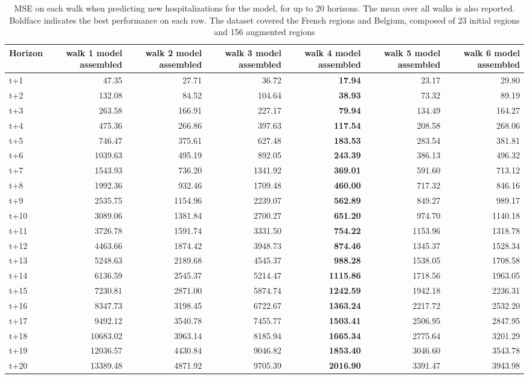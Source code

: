 \begin{table}[H]
\centering
\caption{MSE on each walk when predicting new hospitalizations for the model, for up to 20 horizons. The mean over all walks is also reported. Boldface indicates the best performance on each row. The dataset covered the French regions and Belgium, composed of 23 initial regions and 156 augmented regions }
\label{tab:MSE_walk_assembly}
\begin{tabular}{lrrrrrr}
\toprule
Horizon &  walk 1 model assembled &  walk 2 model assembled &  walk 3 model assembled &  walk 4 model assembled &  walk 5 model assembled &  walk 6 model assembled \\
\midrule
t+1  & 47.35  & 27.71  & 36.72  & \textbf{17.94}  & 23.17  & 29.80  \\
t+2  & 132.08  & 84.52  & 104.64  & \textbf{38.93}  & 73.32  & 89.19  \\
t+3  & 263.58  & 166.91  & 227.17  & \textbf{79.94}  & 134.49  & 164.27  \\
t+4  & 475.36  & 266.86  & 397.63  & \textbf{117.54}  & 208.58  & 268.06  \\
t+5  & 746.47  & 375.61  & 627.48  & \textbf{183.53}  & 283.54  & 381.81  \\
t+6  & 1039.63  & 495.19  & 892.05  & \textbf{243.39}  & 386.13  & 496.32  \\
t+7  & 1543.93  & 736.20  & 1341.92  & \textbf{369.01}  & 591.60  & 713.12  \\
t+8  & 1992.36  & 932.46  & 1709.48  & \textbf{460.00}  & 717.32  & 846.16  \\
t+9  & 2535.75  & 1154.96  & 2239.07  & \textbf{562.89}  & 849.27  & 989.17  \\
t+10  & 3089.06  & 1381.84  & 2700.27  & \textbf{651.20}  & 974.70  & 1140.18  \\
t+11  & 3726.78  & 1591.74  & 3331.50  & \textbf{754.22}  & 1153.96  & 1318.78  \\
t+12  & 4463.66  & 1874.42  & 3948.73  & \textbf{874.46}  & 1345.37  & 1528.34  \\
t+13  & 5248.63  & 2189.68  & 4545.37  & \textbf{988.28}  & 1538.05  & 1708.58  \\
t+14  & 6136.59  & 2545.37  & 5214.47  & \textbf{1115.86}  & 1718.56  & 1963.05  \\
t+15  & 7230.81  & 2871.00  & 5874.74  & \textbf{1242.59}  & 1942.18  & 2236.31  \\
t+16  & 8347.73  & 3198.45  & 6722.67  & \textbf{1363.24}  & 2217.72  & 2532.20  \\
t+17  & 9492.12  & 3540.78  & 7455.77  & \textbf{1503.41}  & 2506.95  & 2847.95  \\
t+18  & 10683.02  & 3963.14  & 8185.94  & \textbf{1665.34}  & 2775.64  & 3201.29  \\
t+19  & 12036.57  & 4430.84  & 9046.82  & \textbf{1853.40}  & 3046.60  & 3543.78  \\
t+20  & 13389.48  & 4871.92  & 9705.39  & \textbf{2016.90}  & 3391.47  & 3943.98  \\

\bottomrule
\end{tabular}
\end{table}
